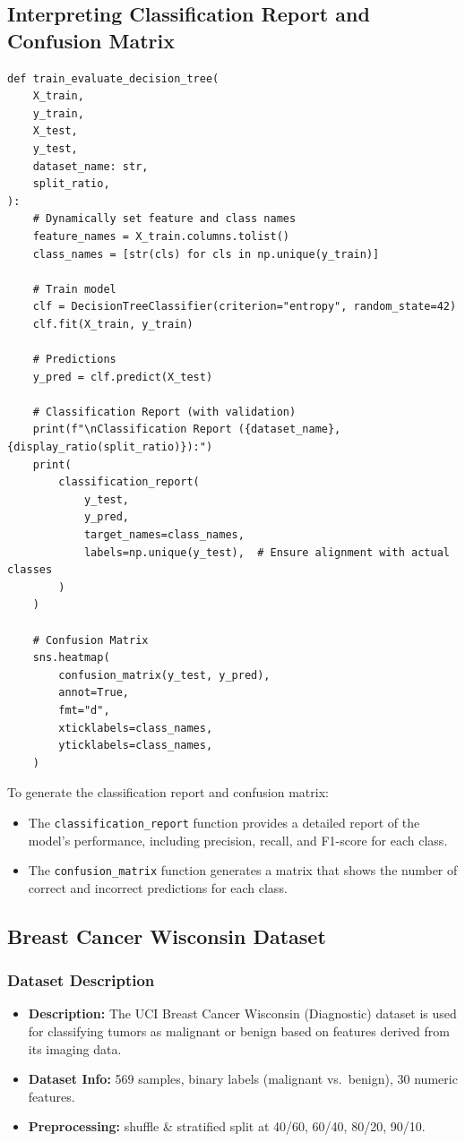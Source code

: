 \subsection{Interpreting Classification Report and Confusion Matrix}
\begin{verbatim}
def train_evaluate_decision_tree(
    X_train,
    y_train,
    X_test,
    y_test,
    dataset_name: str,
    split_ratio,
):
    # Dynamically set feature and class names
    feature_names = X_train.columns.tolist()
    class_names = [str(cls) for cls in np.unique(y_train)]

    # Train model
    clf = DecisionTreeClassifier(criterion="entropy", random_state=42)
    clf.fit(X_train, y_train)

    # Predictions
    y_pred = clf.predict(X_test)

    # Classification Report (with validation)
    print(f"\nClassification Report ({dataset_name}, {display_ratio(split_ratio)}):")
    print(
        classification_report(
            y_test,
            y_pred,
            target_names=class_names,
            labels=np.unique(y_test),  # Ensure alignment with actual classes
        )
    )

    # Confusion Matrix
    sns.heatmap(
        confusion_matrix(y_test, y_pred),
        annot=True,
        fmt="d",
        xticklabels=class_names,
        yticklabels=class_names,
    )
\end{verbatim}
\begin{flushleft}
	To generate the classification report and confusion matrix:
	\begin{itemize}
		\item The \texttt{classification\_report} function provides a detailed report of the model's performance, including precision, recall, and F1-score for each class.
		\item The \texttt{confusion\_matrix} function generates a matrix that shows the number of correct and incorrect predictions for each class.
	\end{itemize}
\end{flushleft}

\clearpage
\subsection{Breast Cancer Wisconsin Dataset}
\subsubsection*{Dataset Description}
\begin{itemize}
	\item \textbf{Description:} The UCI Breast Cancer Wisconsin (Diagnostic) dataset is used for classifying tumors as malignant or benign based on features derived from its imaging data.
	\item \textbf{Dataset Info:} 569 samples, binary labels (malignant vs.\ benign), 30 numeric features.
	\item \textbf{Preprocessing:} shuffle \& stratified split at 40/60, 60/40, 80/20, 90/10.
\end{itemize}

